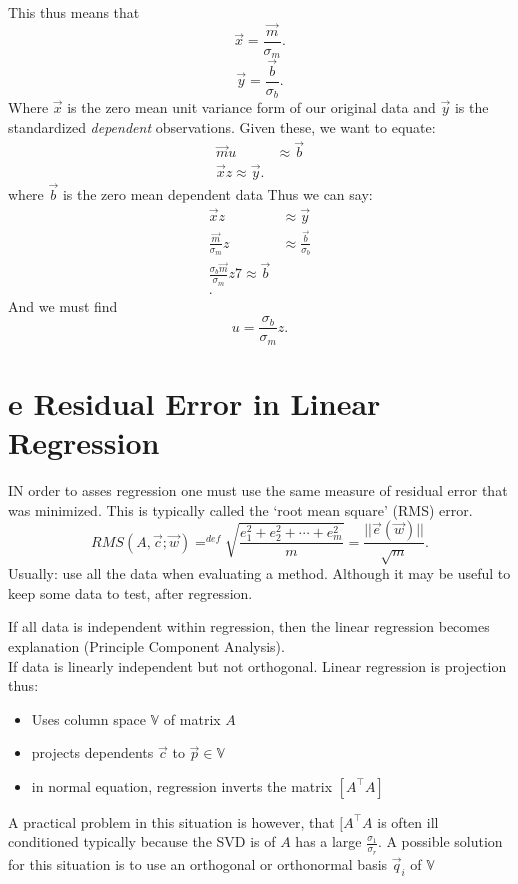\documentclass[12pt]{book}
\begin{document}
This thus means that 
\[
\vec x = \frac{\vec m}{\sigma_m}
.\] 
\[
\vec y = \frac{\vec b}{\sigma_b}
.\] 
Where $\vec x$ is the zero mean unit variance form of our original data and  $\vec y$ is the standardized \textit{dependent} observations.
Given these, we want to equate:
\begin{align*}
        \vec m u &\approx \vec b\\        
        \vec x z \approx \vec y
.\end{align*} 
where $\vec b$ is the zero mean dependent data
Thus we can say:
 \begin{align*}
         \vec x z &\approx \vec y\\
        \frac{\vec m}{\sigma_m}z &\approx \frac{\vec b}{\sigma_b}\\
        \frac{\sigma_b\vec m}{\sigma_m}z 7\approx\vec b\\
.\end{align*}
And we must find
\[
u = \frac{\sigma_b}{\sigma_m}z
.\] 

\section*{e Residual Error in Linear Regression}
IN order to asses regression one must use the same measure of residual error that was minimized.
This is typically called the `root mean square' (RMS) error.
\[
RMS(A,\vec c; \vec w)=^{def} \sqrt{\frac{ e_1^2+e_2^2+ \cdots +e_m^2}{m}} = \frac{||\vec e(\vec w)||}{\sqrt{m} }
.\] 
Usually: use all the data when evaluating a method. Although it may be useful to keep some data to test, after regression.

If all data is independent within regression, then the linear regression becomes explanation (Principle Component Analysis).\\
If data is linearly independent but not orthogonal. 
Linear regression is projection thus:
\begin{itemize}
        \item Uses column space $\mathbb{V}$ of matrix  $A$
        \item projects dependents  $\vec c$ to  $\vec p\in\mathbb{V}$ 
        \item in normal equation, regression inverts the matrix $[A^\top A]$
\end{itemize}
A practical problem in this situation is however, that $[A^\top A$ is often ill conditioned typically because the 
        SVD is of $A$ has a large  $\frac{\sigma_1}{\sigma_r}$. A possible solution for this situation is to use an orthogonal or
        orthonormal basis $\vec q_i$ of  $\mathbb{V}$
\end{document}
